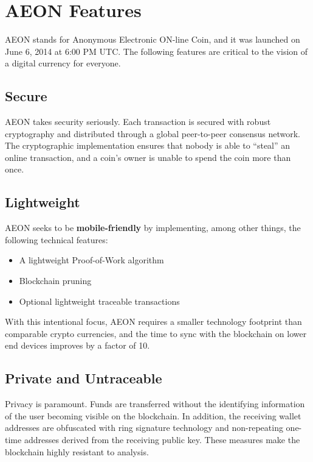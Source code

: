 \section{AEON Features}
AEON stands for Anonymous Electronic ON-line Coin, and it was launched on June 6, 2014 at 6:00 PM UTC. The following features are critical to the vision of a digital currency for everyone.

\subsection{Secure}
AEON takes security seriously.  Each transaction is secured with robust cryptography and distributed through a global peer-to-peer consensus network.  The cryptographic implementation ensures that nobody is able to “steal” an online transaction, and a coin’s owner is unable to spend the coin more than once.

\subsection{Lightweight}
AEON seeks to be \textbf{mobile-friendly} by implementing, among other things, the following technical features:
\begin{itemize}
	\item A lightweight Proof-of-Work algorithm
	\item Blockchain pruning
	\item Optional lightweight traceable transactions
\end{itemize}
With this intentional focus, AEON requires a smaller technology footprint than comparable crypto currencies, and the time to sync with the blockchain on lower end devices improves by a factor of 10. 

\subsection{Private and Untraceable}
Privacy is paramount. Funds are transferred without the identifying information of the user becoming visible on the blockchain. In addition, the receiving wallet addresses are obfuscated with ring signature technology and non-repeating one-time addresses derived from the receiving public key. These measures make the blockchain highly resistant to analysis.

